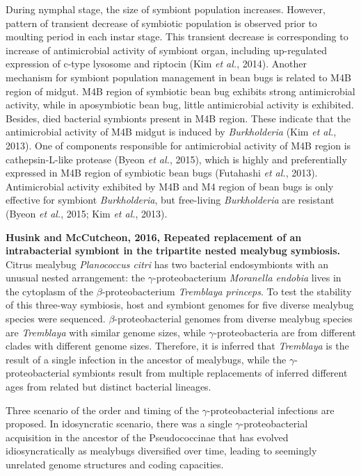 \documentclass[11pt]{article}
\begin{document}
\begin{sloppypar}
During nymphal stage, the size of symbiont population increases. 
However, pattern of transient decrease of symbiotic population is observed prior to moulting period in each instar stage. 
This transient decrease is corresponding to increase of antimicrobial activity of symbiont organ, including up-regulated expression of c-type lysosome and riptocin (Kim \textit{et al.}, 2014). 
Another mechanism for symbiont population management in bean bugs is related to M4B region of midgut. 
M4B region of symbiotic bean bug exhibits strong antimicrobial activity, while in aposymbiotic bean bug, little antimicrobial activity is exhibited. 
Besides, died bacterial symbionts present in M4B region. 
These indicate that the antimicrobial activity of M4B midgut is induced by \textit{Burkholderia} (Kim \textit{et al.}, 2013). 
One of components responsible for antimicrobial activity of M4B region is cathepsin-L-like protease (Byeon \textit{et al.}, 2015), which is highly and preferentially expressed in M4B region of symbiotic bean bugs (Futahashi \textit{et al.}, 2013). 
Antimicrobial activity exhibited by M4B and M4 region of bean bugs is only effective for symbiont \textit{Burkholderia}, but free-living \textit{Burkholderia} are resistant (Byeon \textit{et al.}, 2015; Kim \textit{et al.}, 2013). 
\par
\textbf{Husink and McCutcheon, 2016, Repeated replacement of an intrabacterial symbiont in the tripartite nested mealybug symbiosis.} \newline
Citrus mealybug \textit{Planococcus citri} has two bacterial endosymbionts with an unusual nested arrangement: the $\gamma$-proteobacterium \textit{Moranella endobia} lives in the cytoplasm of the $\beta$-proteobacterium \textit{Tremblaya princeps}. 
To test the stability of this three-way symbiosis, host and symbiont genomes for five diverse mealybug species were sequenced. 
$\beta$-proteobacterial genomes from diverse mealybug species are \textit{Tremblaya} with similar genome sizes, while $\gamma$-proteobacteria are from different clades with different genome sizes. 
Therefore, it is inferred that \textit{Tremblaya} is the result of a single infection in the ancestor of mealybugs, while the $\gamma$-proteobacterial symbionts result from multiple replacements of inferred different ages from related but distinct bacterial lineages. 
\par
Three scenario of the order and timing of the $\gamma$-proteobacterial infections are proposed. 
In idosyncratic scenario, there was a single $\gamma$-proteobacterial acquisition in the ancestor of the Pseudococcinae that has evolved idiosyncratically as mealybugs diversified over time, leading to seemingly unrelated genome structures and coding capacities. 

\end{sloppypar}
\end{document}
